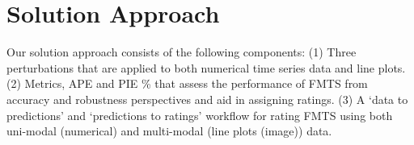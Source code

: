 \section{Solution Approach}
Our solution approach consists of the following 
components: (1) Three perturbations that are applied to both numerical time series data and line plots.  (2) Metrics, APE and PIE \% 
that assess the performance of FMTS from accuracy and robustness perspectives and aid in assigning ratings. (3) A `data to predictions' and `predictions to ratings' workflow for rating FMTS using both uni-modal (numerical) and multi-modal (line plots (image)) data.


